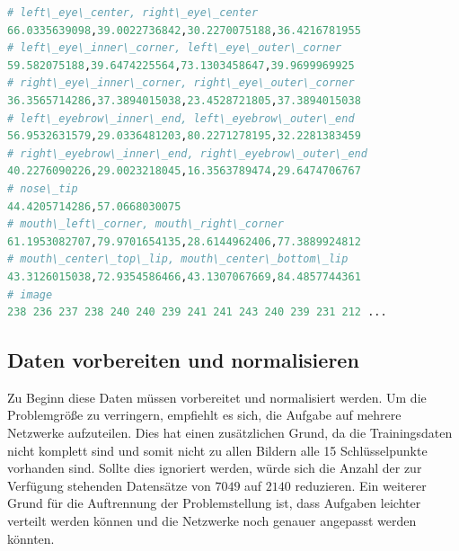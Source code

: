 	\begin{lstlisting}[caption={Ein gesamter Datensatz aus den Trainingsdaten mit den X und Y Werten pro Schlüsselpunkt},label=fig:ausgangsdatenRoh,captionpos=b,language=Python]
# left\_eye\_center, right\_eye\_center
66.0335639098,39.0022736842,30.2270075188,36.4216781955
# left\_eye\_inner\_corner, left\_eye\_outer\_corner
59.582075188,39.6474225564,73.1303458647,39.9699969925
# right\_eye\_inner\_corner, right\_eye\_outer\_corner
36.3565714286,37.3894015038,23.4528721805,37.3894015038
# left\_eyebrow\_inner\_end, left\_eyebrow\_outer\_end
56.9532631579,29.0336481203,80.2271278195,32.2281383459
# right\_eyebrow\_inner\_end, right\_eyebrow\_outer\_end
40.2276090226,29.0023218045,16.3563789474,29.6474706767
# nose\_tip
44.4205714286,57.0668030075
# mouth\_left\_corner, mouth\_right\_corner
61.1953082707,79.9701654135,28.6144962406,77.3889924812
# mouth\_center\_top\_lip, mouth\_center\_bottom\_lip
43.3126015038,72.9354586466,43.1307067669,84.4857744361
# image
238 236 237 238 240 240 239 241 241 243 240 239 231 212 ...
\end{lstlisting}

\subsection{Daten vorbereiten und normalisieren}

Zu Beginn diese Daten müssen vorbereitet und normalisiert werden. 
Um die Problemgröße zu verringern, empfiehlt es sich, die Aufgabe auf mehrere Netzwerke aufzuteilen. 
Dies hat einen zusätzlichen Grund, da die Trainingsdaten nicht komplett sind und somit nicht zu allen Bildern alle 15 Schlüsselpunkte vorhanden sind. 
Sollte dies ignoriert werden, würde sich die Anzahl der zur Verfügung stehenden Datensätze von $7049$ auf $2140$ reduzieren. 
Ein weiterer Grund für die Auftrennung der Problemstellung ist, dass Aufgaben leichter verteilt werden können und die Netzwerke noch genauer angepasst werden könnten. \newline

